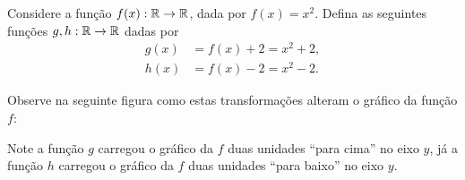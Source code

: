 \begin{exem}
  Considere a função $f(x): \mathbb{R} \to \mathbb{R}$, dada por $f(x)= x^2$. Defina as seguintes funções $g,h: \mathbb{R} \to \mathbb{R}$ dadas por 
  \begin{align*}
        g(x) &= f(x) + 2= x^2 + 2,\\
        h(x) &= f(x) - 2= x^2 - 2.
  \end{align*}
  
    Observe na seguinte figura como estas transformações alteram o gráfico da função $f$:
    
    \begin{center}
\end{center}

    Note a função $g$ carregou o gráfico da $f$ duas unidades ``para cima'' no eixo $y$, já a função $h$ carregou o gráfico da $f$ duas unidades ``para baixo'' no eixo $y$.

 \end{exem}

